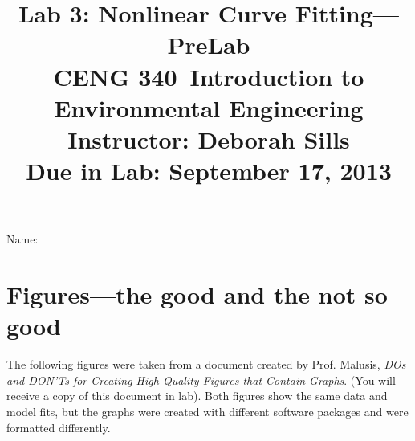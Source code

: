 \documentclass[11pt,letterpaper]{article}
\begin{document}
\setlength{\parindent}{0cm} 



\frenchspacing

\setlength{\textwidth}{6.25in}

\title {\Large{\textbf{Lab 3: Nonlinear Curve Fitting---PreLab}}\\ \large{CENG 340--Introduction to Environmental Engineering\\
Instructor: Deborah Sills\\ \textbf{Due in Lab: September 17, 2013}}}

\author {}
\date {}
\maketitle

\vspace{-1.5cm}

\large{Name:}

\vspace{-0.3cm}

\section *{Figures---the good and the not so good}
The following figures were taken from a document created by Prof. Malusis, \emph{DOs and DON’Ts for Creating High-Quality Figures that Contain Graphs}.   (You will receive a copy of this document in lab).  Both figures show the same data and model fits, but the graphs were created with different software packages and were formatted differently.
\end{document}
